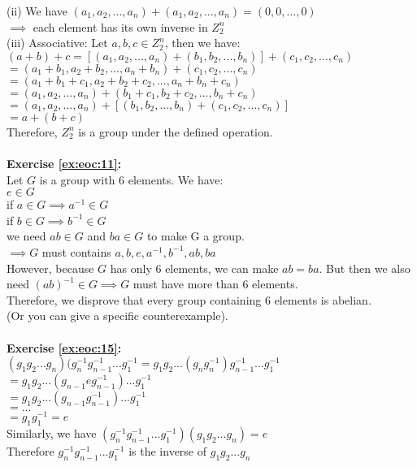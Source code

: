 (ii) We have $(a_1,a_2,...,a_n)+(a_1,a_2,...,a_n)=(0,0,...,0)$\\
$\implies$  each element has its own inverse in $Z_2^n$\\
(iii) Associative: Let $a,b,c\in Z_2^n$, then we have:\\
$(a+b)+c =[(a_1,a_2,...,a_n)+(b_1,b_2,...,b_n)]+(c_1,c_2,...,c_n)$\\
$=(a_1+b_1,a_2+b_2,...,a_n+b_n)+(c_1,c_2,...,c_n)$\\
$=(a_1+b_1+c_1,a_2+b_2+c_2,...,a_n+b_n+c_n)$\\
$=(a_1,a_2,...,a_n)+(b_1+c_1,b_2+c_2,...,b_n+c_n)$\\
$=(a_1,a_2,...,a_n)+[(b_1,b_2,...,b_n)+(c_1,c_2,...,c_n)]$\\
$=a+(b+c)$\\
Therefore, $Z_2^n$ is a group under the defined operation.\\
\\
\textbf{Exercise \ref{ex:eoc:11}:}\\
Let $G$ is a group with 6 elements. We have:\\
$e\in G$\\
if $a\in G\implies a^{-1}\in G$\\
if $b\in G\implies b^{-1}\in G$\\
we need $ab\in G$ and $ba\in G$ to make G a group.\\
$\implies G$ must contains $a,b,e,a^{-1},b^{-1},ab,ba$\\
However, because $G$ has only 6 elements, we can make $ab=ba$. But then we also need $(ab)^{-1}\in G\implies G$ must have more than 6 elements.\\
Therefore, we disprove that every group containing 6 elements is abelian.\\
(Or you can give a specific counterexample).\\
\\
\textbf{Exercise \ref{ex:eoc:15}:}\\
$(g_1g_2...g_n)(g_n^{-1}g_{n-1}^{-1}...g_1^{-1}=g_1g_2...(g_ng_n^{-1})g_{n-1}^{-1}...g_1^{-1}$\\
$=g_1g_2...(g_{n-1}eg_{n-1}^{-1})...g_1^{-1}$\\
$=g_1g_2...(g_{n-1}g_{n-1}^{-1})...g_1^{-1}$\\
$=...$\\
$=g_1g_1^{-1}=e$\\
Similarly, we have $(g_n^{-1}g_{n-1}^{-1}...g_1^{-1})(g_1g_2...g_n)=e$\\
Therefore $g_n^{-1}g_{n-1}^{-1}...g_1^{-1}$ is the inverse of $g_1g_2...g_n$\\
